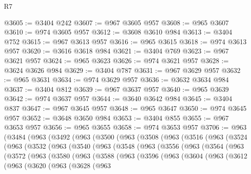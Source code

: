 \begin{lexlean}{R7}
\begin{coremodule}
@3605 := @3404 @242
@3607 := @967 @3605 @957
@3608 := @965 @3607
@3610 := @974 @3605 @957
@3612 := @3608 @3610 @984
@3613 := @3404 @752
@3615 := @967 @3613 @957
@3616 := @965 @3615
@3618 := @974 @3613 @957
@3620 := @3616 @3618 @984
@3621 := @3404 @769
@3623 := @967 @3621 @957
@3624 := @965 @3623
@3626 := @974 @3621 @957
@3628 := @3624 @3626 @984
@3629 := @3404 @787
@3631 := @967 @3629 @957
@3632 := @965 @3631
@3634 := @974 @3629 @957
@3636 := @3632 @3634 @984
@3637 := @3404 @812
@3639 := @967 @3637 @957
@3640 := @965 @3639
@3642 := @974 @3637 @957
@3644 := @3640 @3642 @984
@3645 := @3404 @837
@3647 := @967 @3645 @957
@3648 := @965 @3647
@3650 := @974 @3645 @957
@3652 := @3648 @3650 @984
@3653 := @3404 @855
@3655 := @967 @3653 @957
@3656 := @965 @3655
@3658 := @974 @3653 @957
@3706 := @963
    (@3484
      (@963
        (@3492
          (@963
            (@3500
              (@963
                (@3508
                  (@963
                    (@3516
                      (@963
                        (@3524
                          (@963
                            (@3532
                              (@963
                                (@3540
                                  (@963
                                    (@3548
                                      (@963
                                        (@3556
                                          (@963
                                            (@3564
                                              (@963
                                                (@3572
                                                  (@963
                                                    (@3580
                                                      (@963
                                                        (@3588
                                                          (@963
                                                            (@3596
                                                              (@963
                                                                (@3604
                                                                  (@963
                                                                    (@3612
                                                                      (@963
                                                                        (@3620
                                                                          (@963
                                                                            (@3628
                                                                              (@963

\end{coremodule}
\end{lexlean}
